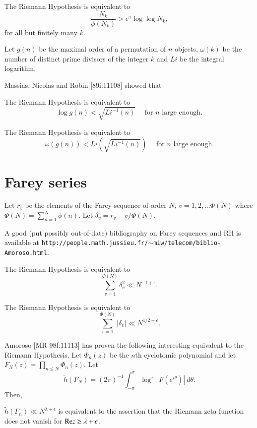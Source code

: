 \documentclass[12pt,letterpaper, reqno]{aimpl}
\begin{document}
\begin{rhequiv}[3.25]The Riemann Hypothesis is
equivalent to
$$
\frac{N_k}{\phi(N_k)} > e^{\gamma} \log \log N_k,
$$
for all but finitely many $k$.
\end{rhequiv}


\begin{problemblock}

Let $g(n)$ be the maximal order of a permutation of $n$ objects,
$\omega(k)$ be the number of distinct prime divisors of the integer $k$
and $Li$ be the integral logarithm.

Massias, Nicolas and Robin [89i:11108] showed that
\begin{rhequivalence}[3.3]The Riemann Hypothesis is
equivalent to
$$
\log g(n) < \sqrt{Li^{-1}(n)} \quad \text{ for $n$ large enough}.
$$
\end{rhequivalence}
\end{problemblock}
\begin{rhequiv}[3.35]The Riemann Hypothesis is
equivalent to
$$
\omega(g(n)) < Li (\sqrt{Li^{-1}(n)}) \quad \text{ for $n$ large enough}.
$$
\end{rhequiv}

\section{Farey series}
 Let $r_v$ be the elements of the Farey sequence of order $N$, $v=1,2,\dots \Phi(N)$ where $\Phi(N)=\sum_{n=1}^N\phi(n)$.  Let $\delta_v=r_v-v/\Phi(N)$.

A good (put possibly out-of-date) bibliography on Farey sequences and RH
is available at {\tt http://people.math.jussieu.fr/$\sim$miw/telecom/biblio-Amoroso.html}.

\begin{rhequiv}[4.1]The Riemann Hypothesis is
equivalent to
$$\sum_{v=1}^{\Phi(N)} \delta_v^2\ll N^{-1+\epsilon}.$$
\end{rhequiv}
\begin{rhequiv}[4.15]The Riemann Hypothesis is
equivalent to
$$\sum_{v=1}^{\Phi(N)} |\delta_v|\ll N^{1/2+\epsilon}.$$
\end{rhequiv}

\begin{problemblock}
Amoroso [MR 98f:11113] has proven the following interesting equivalent
to the Riemann Hypothesis.  Let $\Phi_n(z)$ be the $n$th cyclotomic
polynomial and let $F_N(z) = \prod_{n \le N}\Phi_n(z)$. Let
$$\tilde h(F_N) = (2\pi)^{-1}\int_{-\pi}^\pi \log^+|F(e^{i\theta})|~d\theta.$$
Then,
\begin{rhequivalence}[4.2]
$\tilde h(F_n) \ll N^{\lambda + \epsilon}$ is equivalent to the assertion that the Riemann zeta function does not vanish for ${\rm Re}{z} \ge \lambda + \epsilon$.
\end{rhequivalence}
\end{problemblock}
\end{document}
